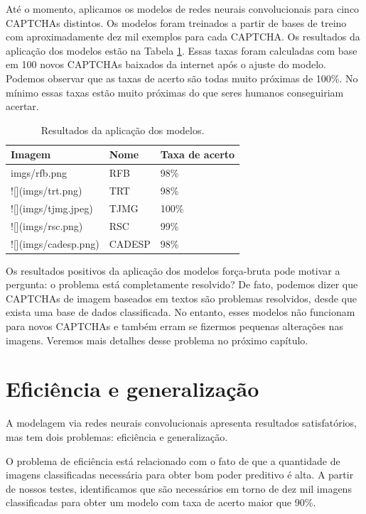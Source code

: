 \documentclass[12pt,]{report}
\begin{document}
Até o momento, aplicamos os modelos de redes neurais convolucionais para
cinco CAPTCHAs distintos. Os modelos foram treinados a partir de bases
de treino com aproximadamente dez mil exemplos para cada CAPTCHA. Os
resultados da aplicação dos modelos estão na Tabela
\ref{tab:resultados}. Essas taxas foram calculadas com base em 100 novos
CAPTCHAs baixados da internet após o ajuste do modelo. Podemos observar
que as taxas de acerto são todas muito próximas de 100\%. No mínimo
essas taxas estão muito próximas do que seres humanos conseguiriam
acertar.

\begin{table}

\caption{\label{tab:resultados}Resultados da aplicação dos modelos.}
\centering
\begin{tabular}[t]{l|l|l}
\hline
Imagem & Nome & Taxa de acerto\\
\hline
imgs/rfb.png & RFB & 98\%\\
\hline
![](imgs/trt.png) & TRT & 98\%\\
\hline
![](imgs/tjmg.jpeg) & TJMG & 100\%\\
\hline
![](imgs/rsc.png) & RSC & 99\%\\
\hline
![](imgs/cadesp.png) & CADESP & 98\%\\
\hline
\end{tabular}
\end{table}

Os resultados positivos da aplicação dos modelos força-bruta pode
motivar a pergunta: o problema está completamente resolvido? De fato,
podemos dizer que CAPTCHAs de imagem baseados em textos são problemas
resolvidos, desde que exista uma base de dados classificada. No entanto,
esses modelos não funcionam para novos CAPTCHAs e também erram se
fizermos pequenas alterações nas imagens. Veremos mais detalhes desse
problema no próximo capítulo.

\chapter{Eficiência e generalização}\label{eficiencia-e-generalizacao}

A modelagem via redes neurais convolucionais apresenta resultados
satisfatórios, mas tem dois problemas: eficiência e generalização.

O problema de eficiência está relacionado com o fato de que a quantidade
de imagens classificadas necessária para obter bom poder preditivo é
alta. A partir de nossos testes, identificamos que são necessários em
torno de dez mil imagens classificadas para obter um modelo com taxa de
acerto maior que 90\%.
\end{document}
